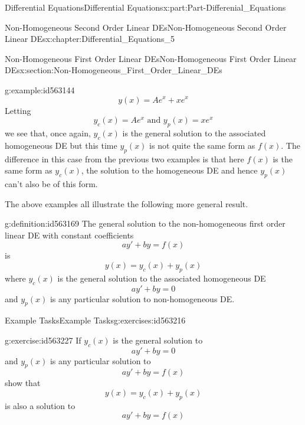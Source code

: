 \documentclass[oneside,10pt,]{book}
\numberwithin{equation}{section}
\begin{document}
\begin{partptx}{Differential Equations}{}{Differential Equations}{}{}{x:part:Part-Differenial_Equations}
\begin{chapterptx}{Non-Homogeneous Second Order Linear DEs}{}{Non-Homogeneous Second Order Linear DEs}{}{}{x:chapter:Differential_Equations_5}
\begin{sectionptx}{Non-Homogeneous First Order Linear DEs}{}{Non-Homogeneous First Order Linear DEs}{}{}{x:section:Non-Homogeneous_First_Order_Linear_DEs}
\begin{example}{}{g:example:id563144}
\begin{equation*}
y(x)=Ae^x+xe^x
\end{equation*}
Letting%
\begin{equation*}
y_c(x)=Ae^x \textrm{ and } y_p(x)=xe^x
\end{equation*}
we see that, once again, \(y_c(x)\) is the general solution to the associated homogeneous DE but this time \(y_p(x)\) is not quite the same form as \(f(x)\). The difference in this case from the previous two examples is that here \(f(x)\) is the same form as \(y_c(x)\), the solution to the homogeneous DE and hence \(y_p(x)\) can’t also be of this form.%
\end{example}
The above examples all illustrate the following more general result.%
\begin{definition}{}{g:definition:id563169}%
The general solution to the non-homogeneous first order linear DE with constant coefficients%
\begin{equation*}
ay'+by=f(x)
\end{equation*}
is%
\begin{equation*}
y(x)=y_c(x)+y_p(x)
\end{equation*}
where \(y_c(x)\) is the general solution to the associated homogeneous DE%
\begin{equation*}
ay'+by=0
\end{equation*}
and \(y_p(x)\) is any particular solution to non-homogeneous DE.%
\end{definition}
%
%
\typeout{************************************************}
\typeout{************************************************}
%
\begin{exercises-subsection-numberless}{Example Tasks}{}{Example Tasks}{}{}{g:exercises:id563216}
\begin{divisionexercise}{1}{}{}{g:exercise:id563227}%
If \(y_c(x)\) is the general solution to%
\begin{equation*}
ay'+by=0
\end{equation*}
and \(y_p(x)\) is any particular solution to%
\begin{equation*}
ay'+by=f(x)
\end{equation*}
show that%
\begin{equation*}
y(x)=y_c(x)+y_p(x)
\end{equation*}
is also a solution to%
\begin{equation*}
ay'+by=f(x)
\end{equation*}
%
\end{divisionexercise}%
\end{exercises-subsection-numberless}

\end{sectionptx}
\end{chapterptx}
\end{partptx}
\end{document}
